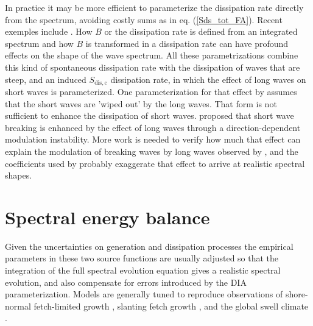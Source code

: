 In practice it may be more efficient to parameterize the dissipation rate directly from the spectrum, avoiding costly sums as in eq. (\ref{Sds_tot_FA}).
Recent exemples include \cite{Romero2019}. How $B$ or the dissipation rate is defined from an integrated spectrum and how $B$ is transformed in a dissipation rate can have profound effects on the shape of the wave spectrum. 
All these 
parametrizations combine this kind of spontaneous dissipation rate with the dissipation of waves that are steep, 
and an induced $S_{\mathrm{dis,c}}$ dissipation rate, in which the effect of long waves on short waves is parameterized. One 
parameterization for that effect by \cite{Ardhuin&al.2010} assumes that the short waves are 'wiped out' by the long waves. That form is not sufficient to enhance the dissipation of short waves. \cite{Peureux&al.2021} proposed that short wave breaking is enhanced by the effect of long waves through a direction-dependent modulation instability. More work is needed to verify how much that effect can explain the modulation of breaking waves by long waves observed by \cite{Dulov&al.2002}, and the coefficients used by \cite{Romero2019} probably exaggerate that effect to arrive at realistic spectral shapes. 


\section{Spectral energy balance}
Given the uncertainties on generation and dissipation processes 
the empirical parameters in these two source functions are usually 
adjusted so that the integration of the full spectral evolution equation gives a realistic spectral evolution, and also compensate for errors introduced by the DIA parameterization. Models are generally tuned to reproduce observations of shore-normal fetch-limited growth 
\citep[e.g.][]{Kahma&Calkoen1992}, slanting fetch growth \citep{Ardhuin&al.2007}, and the global swell climate \citep{Ardhuin&al.2010}. 

